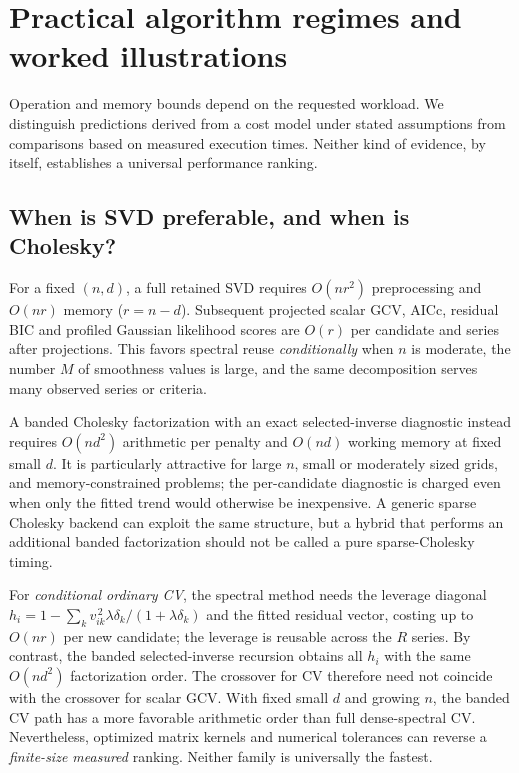 \section{Practical algorithm regimes and worked illustrations}
\label{sec:decision-regimes}
Operation and memory bounds depend on the requested workload.
We distinguish predictions derived from a cost model under stated
assumptions from comparisons based on measured execution times.
Neither kind of evidence, by itself, establishes a universal
performance ranking.

\subsection{When is SVD preferable, and when is Cholesky?}
\label{sec:which-method}
For a fixed $(n,d)$, a full retained SVD requires
$O(nr^2)$ preprocessing and $O(nr)$ memory ($r=n-d$).
Subsequent projected scalar GCV, AICc, residual BIC and
profiled Gaussian likelihood scores are $O(r)$
per candidate and series after projections. This favors
spectral reuse \emph{conditionally} when $n$ is moderate,
the number $M$ of smoothness values is large, and the
same decomposition serves many observed series or criteria.

A banded Cholesky factorization with an exact
selected-inverse diagnostic instead requires
$O(nd^2)$ arithmetic per penalty and $O(nd)$
working memory at fixed small $d$. It is particularly
attractive for large $n$, small or moderately sized grids,
and memory-constrained problems; the per-candidate
diagnostic is charged even when only the fitted trend
would otherwise be inexpensive. A generic sparse Cholesky
backend can exploit the same structure, but a hybrid
that performs an additional banded factorization should
not be called a pure sparse-Cholesky timing.

For \emph{conditional ordinary CV}, the spectral method
needs the leverage diagonal
$h_i=1-\sum_k v_{ik}^{\,2}\lambda\delta_k/(1+\lambda\delta_k)$
and the fitted residual vector, costing up to $O(nr)$
per new candidate; the leverage is reusable across
the $R$ series. By contrast, the banded selected-inverse
recursion obtains all $h_i$ with the same $O(nd^2)$
factorization order. The crossover for CV therefore need not coincide
with the crossover for scalar GCV.
With fixed small $d$ and growing $n$, the banded CV path
has a more favorable arithmetic order than full dense-spectral CV.
Nevertheless, optimized matrix kernels and numerical
tolerances can reverse a \emph{finite-size measured}
ranking. Neither family is universally the fastest.

